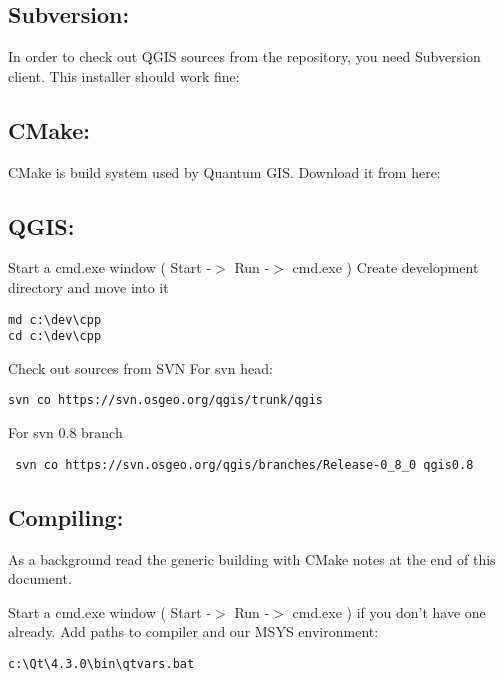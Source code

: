 \subsection{Subversion:}
In order to check out QGIS sources from the repository, you need Subversion
client. This installer should work fine:


\subsection{CMake:}
CMake is build system used by Quantum GIS. Download it from here:


\subsection{QGIS:}
Start a cmd.exe window ( Start -$>$ Run -$>$ cmd.exe ) Create development 
directory and move into it

\begin{verbatim}
md c:\dev\cpp 
cd c:\dev\cpp 
\end{verbatim}

Check out sources from SVN For svn head:

\begin{verbatim}
svn co https://svn.osgeo.org/qgis/trunk/qgis 
\end{verbatim}
For svn 0.8 branch

\begin{verbatim}
 svn co https://svn.osgeo.org/qgis/branches/Release-0_8_0 qgis0.8
\end{verbatim}

\subsection{Compiling:}
As a background read the generic building with CMake notes at the end of 
this document.

Start a cmd.exe window ( Start -$>$ Run -$>$ cmd.exe ) if you don't have one
already.  Add paths to compiler and our MSYS environment:

\begin{verbatim}
c:\Qt\4.3.0\bin\qtvars.bat 
\end{verbatim}

